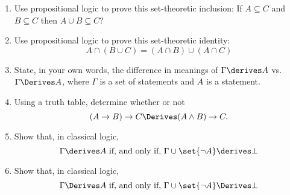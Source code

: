 \documentclass{cs81-homework}
\begin{document}
\begin{enumerate}
  \begin{solution}
  \end{solution}
  
\item Use propositional logic to prove this set-theoretic inclusion: If
  \(A \subseteq C\) and \(B \subseteq C\) then \(A \cup B \subseteq C\)?
  
  \begin{solution}
  \end{solution}
  
\item Use propositional logic to prove this set-theoretic identity:
  \[
    A \cap (B \cup C) = (A \cap B) \cup (A \cap C)
  \]
  
  \begin{solution}
  \end{solution}
  
\item State, in your own words, the difference in meanings of
  \(\Gamma \derives A\) vs. \(\Gamma \Derives A\), where \(\Gamma\) is a set of
  statements and \(A\) is a statement.
  
  \begin{solution}
  \end{solution}
  
\item Using a truth table, determine whether or not
  \[
    (A \to B) \to C \Derives (A \land B) \to C.
  \]
  
  \begin{solution}
  \end{solution}
  
\item Show that, in classical logic,
  \[
    \Gamma \derives A \text{ if, and only if, } \Gamma \cup \set{\neg A} \derives \bot
  \]
  
  \begin{solution}
  \end{solution}
  
\item Show that, in classical logic,
  \[
    \Gamma \Derives A \text{ if, and only if, } \Gamma \cup \set{\neg A} \Derives \bot
  \]
  
  \begin{solution}
  \end{solution}
  
\end{enumerate}
\end{document}

